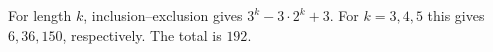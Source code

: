 For length $k$, inclusion--exclusion gives $3^k-3\cdot2^k+3$. For $k=3,4,5$ this gives $6,36,150$, respectively. The total is $\boxed{192}$.
